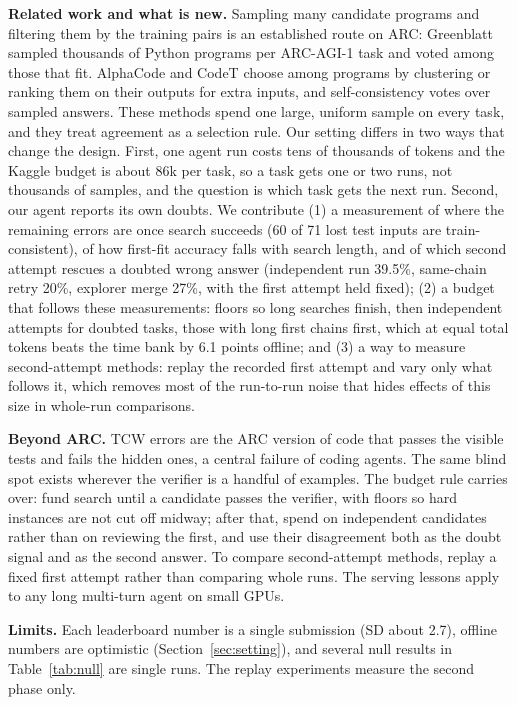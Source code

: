 \documentclass[11pt]{article}
\begin{document}
\textbf{Related work and what is new.} Sampling many candidate programs and filtering them by the training pairs is an established route on ARC: Greenblatt \cite{greenblatt2024} sampled thousands of Python programs per ARC-AGI-1 task and voted among those that fit. AlphaCode \cite{alphacode} and CodeT \cite{codet} choose among programs by clustering or ranking them on their outputs for extra inputs, and self-consistency \cite{selfconsistency} votes over sampled answers. These methods spend one large, uniform sample on every task, and they treat agreement as a selection rule. Our setting differs in two ways that change the design. First, one agent run costs tens of thousands of tokens and the Kaggle budget is about 86k per task, so a task gets one or two runs, not thousands of samples, and the question is which task gets the next run. Second, our agent reports its own doubts. We contribute (1) a measurement of where the remaining errors are once search succeeds (60 of 71 lost test inputs are train-consistent), of how first-fit accuracy falls with search length, and of which second attempt rescues a doubted wrong answer (independent run 39.5\%, same-chain retry 20\%, explorer merge 27\%, with the first attempt held fixed); (2) a budget that follows these measurements: floors so long searches finish, then independent attempts for doubted tasks, those with long first chains first, which at equal total tokens beats the time bank by 6.1 points offline; and (3) a way to measure second-attempt methods: replay the recorded first attempt and vary only what follows it, which removes most of the run-to-run noise that hides effects of this size in whole-run comparisons.

\textbf{Beyond ARC.} TCW errors are the ARC version of code that passes the visible tests and fails the hidden ones, a central failure of coding agents. The same blind spot exists wherever the verifier is a handful of examples. The budget rule carries over: fund search until a candidate passes the verifier, with floors so hard instances are not cut off midway; after that, spend on independent candidates rather than on reviewing the first, and use their disagreement both as the doubt signal and as the second answer. To compare second-attempt methods, replay a fixed first attempt rather than comparing whole runs. The serving lessons apply to any long multi-turn agent on small GPUs.

\textbf{Limits.} Each leaderboard number is a single submission (SD about 2.7), offline numbers are optimistic (Section~\ref{sec:setting}), and several null results in Table~\ref{tab:null} are single runs. The replay experiments measure the second phase only.
\end{document}
